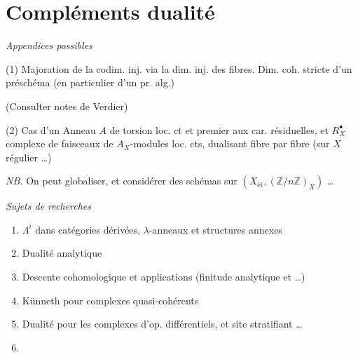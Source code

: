 \documentclass[11pt,a4paper]{article}
\begin{document}
\section{Compléments dualité}


\emph{Appendices possibles}

(1) Majoration de la codim. inj. via la dim. inj. des fibres. Dim. coh.
stricte d'un préschéma (en particulier d'un pr. alg.)

(Consulter notes de Verdier)

(2) Cas d'un Anneau $A$ de torsion loc. ct et premier aux car. résiduelles,
et $R^{\bullet}_{X}$ complexe de faisceaux de $A_{X}$-modules loc. cts,
dualisant fibre par fibre (sur $X$ régulier …)

\emph{NB.} On peut globaliser, et considérer des schémas 
sur $(X_{\text{ét}}, (\mathbb{Z}/n\mathbb{Z})_{X})$ …


\emph{Sujets de recherches}
\begin{enumerate}
  \item[a)] $\Lambda^{i}$ dans catégories dérivées, $\lambda$-anneaux et structures annexes
  \item[b)] Dualité analytique
  \item[c)] Descente cohomologique et applications (finitude analytique et \ill{} …)
  \item[d)] Künneth pour complexes quasi-cohérents
  \item[e)] Dualité pour les complexes d'op. différentiels, et site stratifiant …
  \item[f)] 
\end{enumerate}
\end{document}
